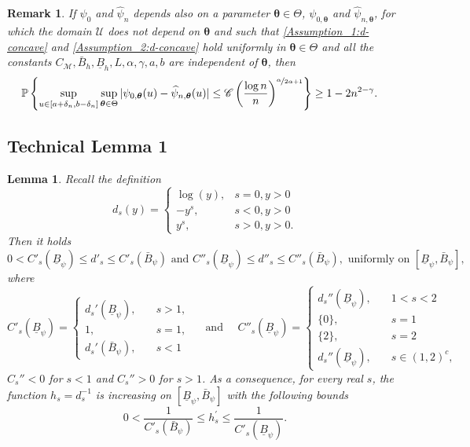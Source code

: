 \documentclass{article} %
\newtheorem{lemma}[theorem]{Lemma}
\newtheorem{remark}[theorem]{Remark}
\begin{document}
\begin{remark}\label{remark:s_concavity_uniform_theta}
If $\psi_0$ and $\widehat{\psi}_n$ depends also on a parameter $\boldsymbol{\theta} \in \Theta$, $\psi_{0,\boldsymbol{\theta}}$ and $\widehat{\psi}_{n,\boldsymbol{\theta}}$, for which the domain $\mathcal{U}$ does not depend on $\boldsymbol{\theta}$ and such that \cref{Assumption_1:d-concave} and \cref{Assumption_2:d-concave} hold uniformly in $\boldsymbol{\theta} \in \Theta$ and all the constants $C_{\mathscr{M}},\bar{B}_{h},\underline{B}_{h},L,\alpha,\gamma,a,b$ are independent of $\boldsymbol{\theta}$, then
$$
\begin{aligned}
\mathbb{P}\left\{\sup _{u \in[a+\delta_n, b-\delta_n]}\sup_{\boldsymbol{\theta} \in \Theta} |\psi_{0,\boldsymbol{\theta}}(u) - \widehat{\psi}_{n,\boldsymbol{\theta}}(u)| \leq \mathscr{C} \left( \frac{\log n}{n}\right)^{\nicefrac{\alpha}{2\alpha +1}}  \right\} & \geq 1-2n^{2-\gamma}.
\end{aligned}
$$
\end{remark}

\subsection{Technical Lemma 1}\label{app:tecnical_lemma_1}

\begin{lemma}\label{lemma:prop_d_alpha_1}
Recall the definition
$$
d_s(y)= \begin{cases}\log (y), & s=0, y>0 \\ -y^s, & s<0, y > 0  \\ y^s, & s>0, y > 0.\end{cases}
$$
Then it holds
$$
0< C'_{s}(\underline{B}_{\psi}) \leq d'_{s} \leq C'_{s}(\bar{B}_{\psi}) \text{ and } C''_{s}(\underline{B}_{\psi}) \leq d''_{s} \leq C''_{s}(\bar{B}_{\psi}), \text{ uniformly on }[\underline{B}_{\psi}, \bar{B}_{\psi}],
$$
where 
\begin{equation}\label{def:C'_s}
C'_{s}(\underline{B}_{\psi})=
\begin{cases}
    d_{s}'(\underline{B}_{\psi}), \quad &s >1,\\
    1, \quad &s =1,\\
    d_{s}'(\bar{B}_{\psi}), \quad &s <1
\end{cases}
\quad \text{ and } \quad 
C''_{s}(\underline{B}_{\psi}) = 
\begin{cases}
    d_{s}''(\underline{B}_{\psi}),\quad & 1< s < 2\\
    \{0\},\quad & s = 1\\
    \{2\},\quad & s = 2\\
    d_{s}''(\underline{B}_{\psi}),\quad & s \in (1,2)^c,
\end{cases}
\end{equation}
$C_s''< 0$ for $s<1$ and $C_s''>0$ for $s> 1$. As a consequence, for every real $s$, the function $h_{s} = d_{s}^{-1}$ is increasing on $[\underline{B}_{\psi}, \bar{B}_{\psi}]$ with the following bounds
$$
0<\frac{1}{C'_{s}(\bar{B}_{\psi})}\leq h_{s}^{\prime} \leq \frac{1}{C'_{s}(\underline{B}_{\psi})}.
$$
\end{lemma}
\end{document}
